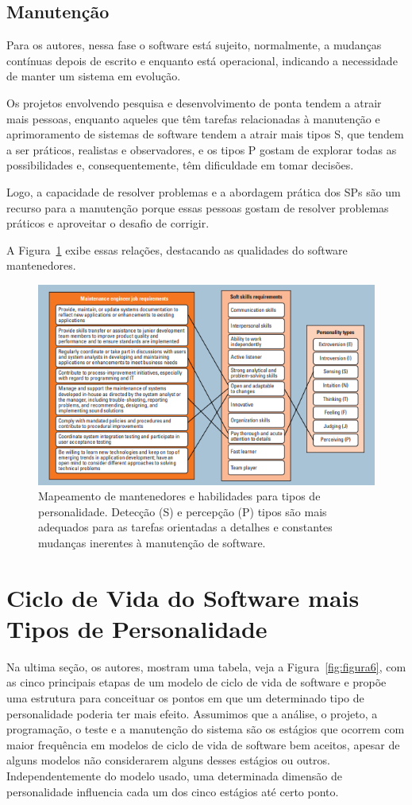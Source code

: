 \documentclass[12pt]{article}
\begin{document}
\subsection{Manutenção}
Para os autores, nessa fase o software está sujeito, normalmente, a mudanças contínuas depois de escrito e enquanto está operacional, indicando a necessidade de manter um sistema em evolução. 

Os projetos envolvendo pesquisa e desenvolvimento de ponta tendem a atrair mais pessoas, enquanto aqueles que têm tarefas relacionadas à manutenção e aprimoramento de sistemas de software tendem a atrair mais tipos S, que tendem a ser práticos, realistas e observadores, e os tipos P  gostam de explorar todas as possibilidades e, consequentemente, têm dificuldade em tomar decisões. 

Logo, a capacidade de resolver problemas e a abordagem prática dos SPs são um recurso para a manutenção porque essas pessoas gostam de resolver problemas práticos e aproveitar o desafio de corrigir.

A Figura~\ref{fig:figura5} exibe essas relações, destacando as qualidades do software
mantenedores.
\begin{figure}[!ht]
\centering
\includegraphics[width=.7\textwidth]{Capturar4.PNG}
\caption{Mapeamento de mantenedores e habilidades para tipos de personalidade. Detecção (S) e percepção (P) tipos são mais adequados para as tarefas orientadas a detalhes e constantes mudanças inerentes à manutenção de software.}
\label{fig:figura5}
\end{figure}
\section{Ciclo de Vida do Software mais Tipos de Personalidade}

Na ultima seção, os autores, mostram uma tabela, veja a Figura~\ref{fig:figura6}, com as cinco principais etapas de um modelo de ciclo de vida de software e propõe uma estrutura para conceituar os pontos em que um determinado tipo de personalidade poderia ter mais efeito. Assumimos que a análise, o projeto, a programação, o teste e a manutenção do sistema são os estágios que ocorrem com maior frequência em modelos de ciclo de vida de software bem aceitos, apesar de alguns modelos não considerarem alguns desses estágios ou outros. Independentemente do modelo usado, uma determinada dimensão de personalidade influencia cada um dos cinco estágios até certo ponto. 
\end{document}

